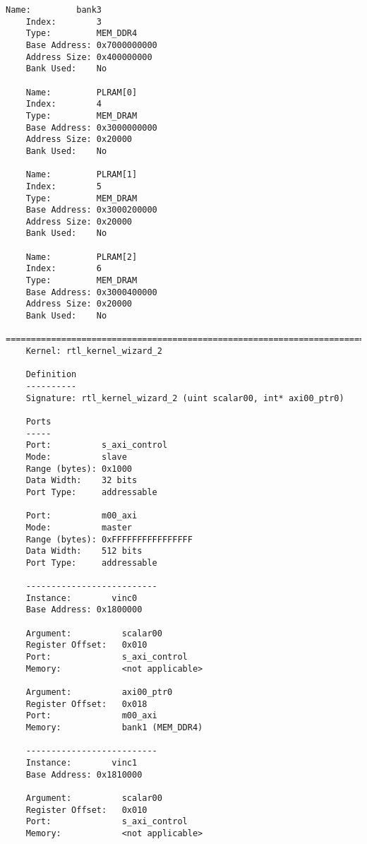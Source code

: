 \begin{lstlisting}[caption=Содержимое файла vinc.xclbin.info для измененного проекта, label={infof2}]
	Name:         bank3
	Index:        3
	Type:         MEM_DDR4
	Base Address: 0x7000000000
	Address Size: 0x400000000
	Bank Used:    No
	
	Name:         PLRAM[0]
	Index:        4
	Type:         MEM_DRAM
	Base Address: 0x3000000000
	Address Size: 0x20000
	Bank Used:    No
	
	Name:         PLRAM[1]
	Index:        5
	Type:         MEM_DRAM
	Base Address: 0x3000200000
	Address Size: 0x20000
	Bank Used:    No
	
	Name:         PLRAM[2]
	Index:        6
	Type:         MEM_DRAM
	Base Address: 0x3000400000
	Address Size: 0x20000
	Bank Used:    No
	==============================================================================
	Kernel: rtl_kernel_wizard_2
	
	Definition
	----------
	Signature: rtl_kernel_wizard_2 (uint scalar00, int* axi00_ptr0)
	
	Ports
	-----
	Port:          s_axi_control
	Mode:          slave
	Range (bytes): 0x1000
	Data Width:    32 bits
	Port Type:     addressable
	
	Port:          m00_axi
	Mode:          master
	Range (bytes): 0xFFFFFFFFFFFFFFFF
	Data Width:    512 bits
	Port Type:     addressable
	
	--------------------------
	Instance:        vinc0
	Base Address: 0x1800000
	
	Argument:          scalar00
	Register Offset:   0x010
	Port:              s_axi_control
	Memory:            <not applicable>
	
	Argument:          axi00_ptr0
	Register Offset:   0x018
	Port:              m00_axi
	Memory:            bank1 (MEM_DDR4)
	
	--------------------------
	Instance:        vinc1
	Base Address: 0x1810000
	
	Argument:          scalar00
	Register Offset:   0x010
	Port:              s_axi_control
	Memory:            <not applicable>
	

\end{lstlisting}
